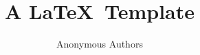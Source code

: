 \documentclass[sigconf]{acmart}
\begin{document}
\title{A \LaTeX\ Template}


\author{Anonymous Authors}

\renewcommand{\shortauthors}{R. Gibb .et al.}

\begin{abstract}
	\blindtext
\end{abstract}

\maketitle





\end{document}
